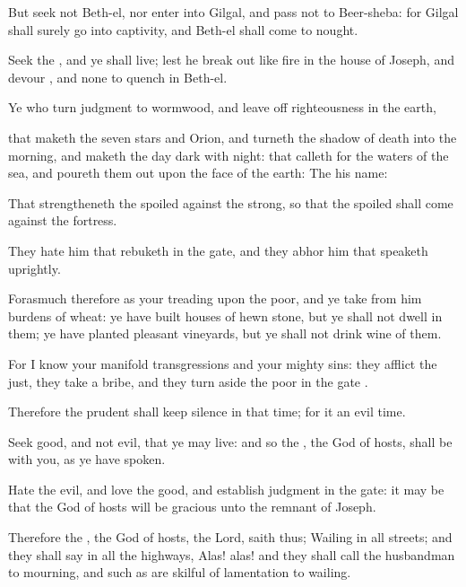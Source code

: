 {But
seek not
Beth-el, nor
enter into
Gilgal, and
pass not to
Beer-sheba: for
Gilgal shall
surely go into
captivity, and
Beth-el shall come to
nought.

Seek the
{}, and ye shall
live; lest he break
out like
fire in the
house of
Joseph, and
devour
{}, and
{} none to
quench
{} in
Beth-el.

Ye who
turn
judgment to
wormwood, and leave
off
righteousness in the
earth,

 that
maketh the seven
stars and
Orion, and
turneth the shadow of
death into the
morning, and maketh the
day
dark with
night: that
calleth for the
waters of the
sea, and poureth them
out upon the
face of the
earth: The
{}
{} his
name:

That
strengtheneth the
spoiled against the
strong, so that the
spoiled shall
come against the
fortress.

They
hate him that
rebuketh in the
gate, and they
abhor him that
speaketh
uprightly.

Forasmuch therefore as your
treading
{} upon the
poor, and ye
take from him
burdens of
wheat: ye have
built
houses of hewn
stone, but ye shall not
dwell in them; ye have
planted
pleasant
vineyards, but ye shall not
drink
wine of them.

For I
know your
manifold
transgressions and your
mighty
sins: they
afflict the
just, they
take a
bribe, and they turn
aside the
poor in the
gate
{}.

Therefore the
prudent shall keep
silence in that
time; for it
{} an
evil
time.

Seek
good, and not
evil, that ye may
live: and so the
{}, the
God of
hosts, shall be with you, as ye have
spoken.

Hate the
evil, and
love the
good, and
establish
judgment in the
gate: it may be that the
{}
God of
hosts will be
gracious unto the
remnant of
Joseph.


\par }{\PP {}Therefore the
{}, the
God of
hosts, the
Lord,
saith thus;
Wailing
{} in all
streets; and they shall
say in all the
highways,
Alas!
alas! and they shall
call the
husbandman to
mourning, and such as are
skilful of
lamentation to
wailing.

}
